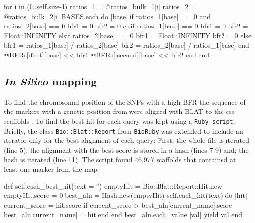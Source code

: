\begin{code}[language=Ruby,caption=Section of the code that , label=lst:yr15:bfr]
for i in (0..self.size-1)
  ratios_1 = @ratios_bulk_1[i]
  ratios_2 = @ratios_bulk_2[i]
  BASES.each do |base| 
    if ratios_1[base] == 0 and ratios_2[base] == 0
      bfr1 = 0
      bfr2 = 0
    elsif ratios_1[base] == 0
      bfr1 = 0
      bfr2 = Float::INFINITY
    elsif ratios_2[base] == 0
      bfr1 = Float::INFINITY
      bfr2 = 0
    else
      bfr1 = ratios_1[base] / ratios_2[base]
      bfr2 = ratios_2[base] / ratios_1[base]
    end
    @BFRs[:first][base] << bfr1
    @BFRs[:second][base] << bfr2
  end
end
\end{code}

\subsection{\textit{In Silico} mapping}
\label{yr15:met:inSilico}

To find the chromosomal position of the SNPs with a high BFR the sequence of the markers with a genetic position from \citet{Wang2014} were aligned with BLAT \citep{Kent2002} to the \acrshort{css} scaffolds \citep{Mayer2014}. 
To find the best hit for each query was kept using a \texttt{Ruby script}. 
Briefly, the class \texttt{Bio::Blat::Report} from \texttt{BioRuby} \citep{Goto2010} was extended to include an iterator only for the best alignment of each query: 
First, the whole file is iterated (line 5); the alignment with the best score is stored in a hash (lines 7-9) and; the hash is iterated (line 11).
The script found 46,977 scaffolds that contained at least one marker from the map. 

\begin{code}[language=Ruby,caption=Extension to \texttt{Bio::Blat::Report} that selects the best alignment from a \texttt{psl file from BLAT} , label=lst:yr15:bestHit]
def self.each_best_hit(text = '')
  emptyHit = Bio::Blat::Report::Hit.new
  emptyHit.score = 0
  best_aln = Hash.new(emptyHit)
  self.each_hit(text) do |hit|
    current_score = hit.score
    if current_score > best_aln[current_name].score
      best_aln[current_name] = hit 
    end
  end
  best_aln.each_value { |val| yield  val }
end
\end{code}

